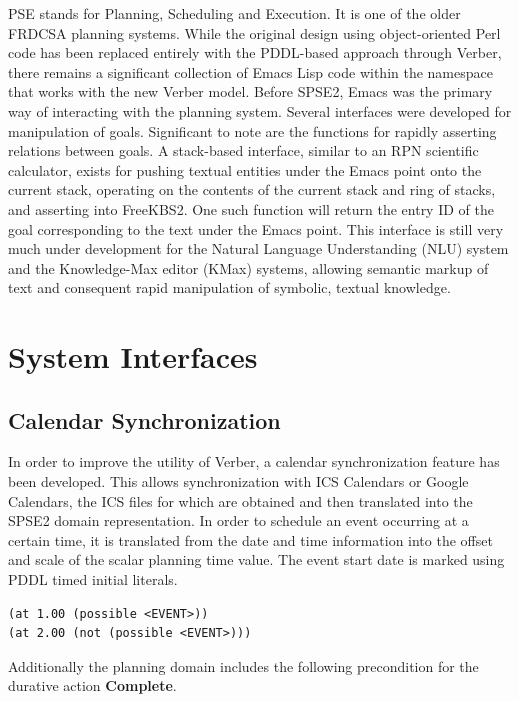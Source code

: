 \documentclass[letterpaper]{article}
\begin{document}
\noindent PSE stands for Planning, Scheduling and Execution.  It is
one of the older FRDCSA planning systems.  While the original design
using object-oriented Perl code has been replaced entirely with the
PDDL-based approach through Verber, there remains a significant
collection of Emacs Lisp code within the namespace that works with the
new Verber model.  Before SPSE2, Emacs was the primary way of
interacting with the planning system.  Several interfaces were
developed for manipulation of goals.  Significant to note are the
functions for rapidly asserting relations between goals.  A
stack-based interface, similar to an RPN scientific calculator, exists
for pushing textual entities under the Emacs point onto the current
stack, operating on the contents of the current stack and ring of
stacks, and asserting into FreeKBS2.  One such function will return
the entry ID of the goal corresponding to the text under the Emacs
point.  This interface is still very much under development for the
Natural Language Understanding (NLU) system and the Knowledge-Max
editor (KMax) systems, allowing semantic markup of text and consequent
rapid manipulation of symbolic, textual knowledge.

\section{System Interfaces}

\subsection{Calendar Synchronization}

In order to improve the utility of Verber, a calendar synchronization
feature has been developed.  This allows synchronization with ICS
Calendars or Google Calendars, the ICS files for which are obtained
and then translated into the SPSE2 domain representation.  In order to
schedule an event occurring at a certain time, it is translated from
the date and time information into the offset and scale of the scalar
planning time value.  The event start date is marked using PDDL timed
initial literals.

\begin{footnotesize}
\begin{verbatim}
(at 1.00 (possible <EVENT>))
(at 2.00 (not (possible <EVENT>)))
\end{verbatim}
\end{footnotesize}

\noindent Additionally the planning domain includes the following
precondition for the durative action {\bf Complete}.
\end{document}
